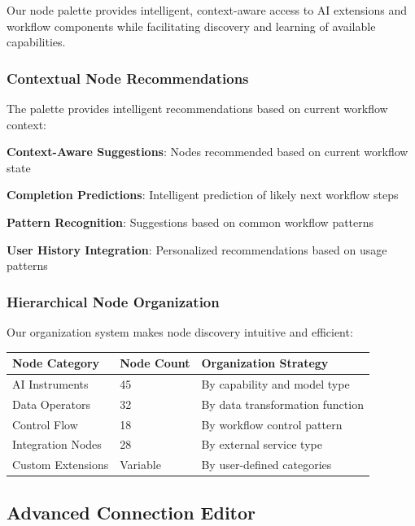 Our node palette provides intelligent, context-aware access to AI extensions and workflow components while facilitating discovery and learning of available capabilities.

\subsubsection*{Contextual Node Recommendations}

The palette provides intelligent recommendations based on current workflow context:

\begin{expandedlist}
    \item \textbf{Context-Aware Suggestions}: Nodes recommended based on current workflow state
    \item \textbf{Completion Predictions}: Intelligent prediction of likely next workflow steps
    \item \textbf{Pattern Recognition}: Suggestions based on common workflow patterns
    \item \textbf{User History Integration}: Personalized recommendations based on usage patterns
\end{expandedlist}

\subsubsection*{Hierarchical Node Organization}

Our organization system makes node discovery intuitive and efficient:

\begin{center}
\begin{tabular}{@{}lll@{}}
\toprule
\textbf{Node Category} & \textbf{Node Count} & \textbf{Organization Strategy} \\
\midrule
AI Instruments & 45 & By capability and model type \\
Data Operators & 32 & By data transformation function \\
Control Flow & 18 & By workflow control pattern \\
Integration Nodes & 28 & By external service type \\
Custom Extensions & Variable & By user-defined categories \\
\bottomrule
\end{tabular}
\end{center}

\subsection*{Advanced Connection Editor}

